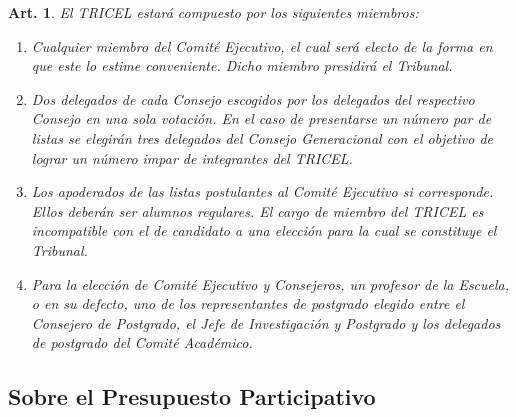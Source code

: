 \documentclass[letterpaper,11pt]{article}
\theoremstyle{plain}
\newtheorem{art}{Art.} %
\begin{document}
			\begin{art}\label{composicionTRICEL}
				El TRICEL estará compuesto por los siguientes miembros:
				\begin{enumerate}
					\item Cualquier miembro del Comité Ejecutivo, el cual será electo de la forma en que este lo estime conveniente. Dicho miembro presidirá el Tribunal.
					\item Dos delegados de cada  Consejo escogidos por los delegados del respectivo Consejo en una sola votación. En el caso de presentarse un número par de listas se elegirán tres delegados del Consejo Generacional con el objetivo de lograr un número impar de integrantes del TRICEL.
					\item Los apoderados de las listas postulantes al Comité Ejecutivo si corresponde. Ellos deberán ser alumnos regulares. El cargo de miembro del TRICEL es incompatible con el de candidato a una elección para la cual se constituye el Tribunal.
					\item Para la elección de Comité Ejecutivo y Consejeros, un profesor de la Escuela, o en su defecto, uno de los representantes de postgrado elegido entre el Consejero de Postgrado, el Jefe de Investigación y Postgrado y los delegados de postgrado del Comité Académico.
				\end{enumerate}
			\end{art}

		\subsection*{Sobre el Presupuesto Participativo}
\end{document}
